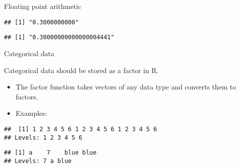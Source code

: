 \begin{frame}[fragile]{Floating point arithmetic}
\begin{verbatim}
## [1] "0.3000000000"
\end{verbatim}

\begin{Shaded}
\end{Shaded}

\begin{verbatim}
## [1] "0.30000000000000004441"
\end{verbatim}

\end{frame}

\begin{frame}[fragile]{Categorical data}
\protect\hypertarget{categorical-data}{}

Categorical data should be stored as a factor in R.

\begin{itemize}
\tightlist
\item
  The factor function takes vectors of any data type and converts them
  to factors.
\item
  Examples:
\end{itemize}

\begin{Shaded}
\begin{Highlighting}[]
\StringTok{ }\NormalTok{(}\NormalTok{(}\OperatorTok{:}\NormalTok{, } \NormalTok{))}
\end{Highlighting}
\end{Shaded}

\begin{verbatim}
##  [1] 1 2 3 4 5 6 1 2 3 4 5 6 1 2 3 4 5 6
## Levels: 1 2 3 4 5 6
\end{verbatim}

\begin{Shaded}
\begin{Highlighting}[]
\StringTok{ }\NormalTok{(}\NormalTok{(}\NormalTok{, }\NormalTok{, }\NormalTok{, }\NormalTok{))}
\end{Highlighting}
\end{Shaded}

\begin{verbatim}
## [1] a    7    blue blue
## Levels: 7 a blue
\end{verbatim}

\end{frame}

